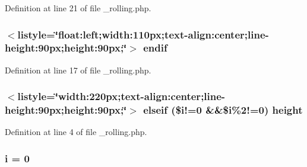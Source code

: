 Definition at line 21 of file \-\_\-rolling.\-php.

\hypertarget{live_2modules_2partner_2templates_2__rolling_8php_adea01712e18f507dd4471d6f2c1cd4b8}{
\subsubsection[{endif}]{\setlength{\rightskip}{0pt plus 5cm}$<$listyle=\char`\"{}float\-:left;width\-:110px;text-\/align\-:center;line-\/height\-:90px;height\-:90px;\char`\"{}$>$ endif}}\label{live_2modules_2partner_2templates_2__rolling_8php_adea01712e18f507dd4471d6f2c1cd4b8}


Definition at line 17 of file \-\_\-rolling.\-php.

\hypertarget{live_2modules_2partner_2templates_2__rolling_8php_aea65f358ba50c3ef234d1b922c6ffd8c}{
\subsubsection[{height}]{\setlength{\rightskip}{0pt plus 5cm}$<$listyle=\char`\"{}width\-:220px;text-\/align\-:center;line-\/height\-:90px;height\-:90px;\char`\"{}$>$ elseif (\$i!=0 \&\&\${\bf i}\%2!=0) height}}\label{live_2modules_2partner_2templates_2__rolling_8php_aea65f358ba50c3ef234d1b922c6ffd8c}


Definition at line 4 of file \-\_\-rolling.\-php.

\hypertarget{live_2modules_2partner_2templates_2__rolling_8php_a7e98b8a17c0aad30ba64d47b74e2a6c1}{
\subsubsection[{i}]{\setlength{\rightskip}{0pt plus 5cm}i = 0}}\label{live_2modules_2partner_2templates_2__rolling_8php_a7e98b8a17c0aad30ba64d47b74e2a6c1}


